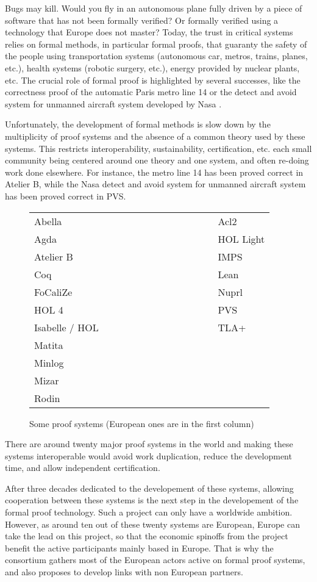 Bugs may kill. Would you fly in an autonomous plane fully driven by a
piece of software that has not been formally verified?  Or formally
verified using a technology that Europe does not master? Today, the
trust in critical systems relies on formal methods, in particular
formal proofs, that guaranty the safety of the people using
transportation systems (autonomous car, metros, trains, planes, etc.),
health systems (robotic surgery, etc.), energy provided by nuclear
plants, etc. The crucial role of formal proof is highlighted by
several successes, like the correctness proof of the automatic Paris
metro line 14 \cite{metro14} or the detect and avoid system for
unmanned aircraft system developed by Nasa \cite{Munoz16}.

\thispagestyle{empty}

Unfortunately, the development of formal methods is slow down by the
multiplicity of proof systems and the absence of a common theory used
by these systems. This restricts interoperability, sustainability,
certification, etc.  each small community being centered around one
theory and one system, and often re-doing work done elsewhere.  For
instance, the metro line 14 has been proved correct in Atelier B,
while the Nasa detect and avoid system for unmanned aircraft system
has been proved correct in PVS.

\begin{figure}
\begin{tabular}{ll}
{\sc Abella}~~~~~~~~~~~~~~~~~~~~~~~~~~~~~~&{\sc Acl2}\\
{\sc Agda}  &  {\sc HOL Light}\\
{\sc Atelier B}  &  {\sc IMPS}\\
{\sc Coq}  &  {\sc Lean}\\
{\sc FoCaliZe}  &  {\sc Nuprl}\\
{\sc HOL 4}  &  {\sc PVS}\\
{\sc Isabelle / HOL}  &  {\sc TLA+}\\
{\sc Matita}\\
{\sc Minlog}\\
{\sc Mizar}\\
{\sc Rodin}\\
\end{tabular}
\caption{Some proof systems (European ones are in the first column)}
\end{figure}

There are around twenty major proof systems in the world and making
these systems interoperable would avoid work duplication, reduce the
development time, and allow independent certification.

After three decades dedicated to the developement of these systems,
allowing cooperation between these systems is the next step in the
developement of the formal proof technology.
Such a project can only have a worldwide ambition. However, as around
ten out of these twenty systems are European, Europe can take the lead
on this project, so that the economic spinoffs from the project
benefit the active participants mainly based in Europe.
That is why the consortium gathers most of the European actors active
on formal proof systems, and also proposes to develop links with non
European partners.

